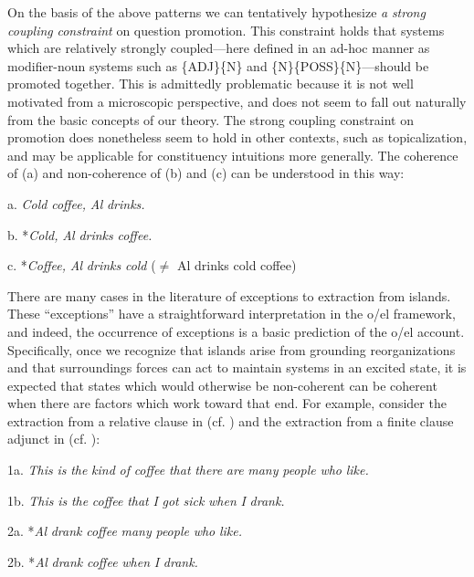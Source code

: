   On the basis of the above patterns we can tentatively hypothesize \textit{a} \textit{strong} \textit{coupling} \textit{constraint} on question promotion. This constraint holds that systems which are relatively strongly coupled—here defined in an ad-hoc manner as modifier-noun systems such as \{ADJ\}\{N\} and \{N\}\{POSS\}\{N\}—should be promoted together. This is admittedly problematic because it is not well motivated from a microscopic perspective, and does not seem to fall out naturally from the basic concepts of our theory. The strong coupling constraint on promotion does nonetheless seem to hold in other contexts, such as topicalization, and may be applicable for constituency intuitions more generally. The coherence of (a) and non-coherence of (b) and (c) can be understood in this way:

  a.  \textit{Cold} \textit{coffee,} \textit{Al} \textit{drinks.}

  b.  *\textit{Cold,} \textit{Al} \textit{drinks} \textit{coffee.}

  c.  *\textit{Coffee,} \textit{Al} \textit{drinks} \textit{cold}  (${\neq}$ Al drinks cold coffee)

  There are many cases in the literature of exceptions to extraction from islands. These “exceptions” have a straightforward interpretation in the o/el framework, and indeed, the occurrence of exceptions is a basic prediction of the o/el account. Specifically, once we recognize that islands arise from grounding reorganizations and that surroundings forces can act to maintain systems in an excited state, it is expected that states which would otherwise be non-coherent can be coherent when there are factors which work toward that end. For example, consider the extraction from a relative clause in  (cf. \citep{Erteschik-ShirLappin1979}) and the extraction from a finite clause adjunct in  (cf. \citep{Truswell2011}):

  1a. \textit{This} \textit{is} \textit{the} \textit{kind} \textit{of} \textit{coffee} \textit{that} \textit{there} \textit{are} \textit{many} \textit{people} \textit{who} \textit{like.}

  1b. \textit{This} \textit{is} \textit{the} \textit{coffee} \textit{that} \textit{I} \textit{got} \textit{sick} \textit{when} \textit{I} \textit{drank.}

  2a. *\textit{Al} \textit{drank} \textit{coffee} \textit{many} \textit{people} \textit{who} \textit{like.}

  2b. *\textit{Al} \textit{drank} \textit{coffee} \textit{when} \textit{I} \textit{drank.}

